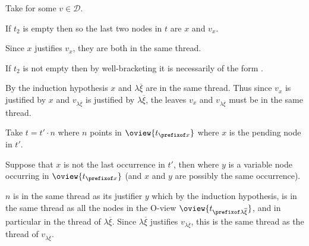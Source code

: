 \begin{compactitem}
    \item[\rulenamet{InputValue}] Take  for some
        $v \in \mathcal{D}$.

        \begin{compactitem}
        \item  If $t_2$ is empty then  so the last two nodes in $t$ are
        $x$ and $v_x$.

        Since $x$ justifies $v_x$, they are both in the same thread.

        \item If $t_2$ is not empty then by well-bracketing it is
        necessarily of the form .

            By the induction hypothesis  $x$ and $\lambda \overline{\xi}$ are in the same thread. Thus since $v_x$
                is justified by $x$ and $v_{\lambda \overline{\xi}}$ is
                justified by $\lambda  \overline{\xi}$, the leaves $v_x$ and $v_{\lambda \overline{\xi}}$ must
                be in the same thread.
        \end{compactitem}

    \item[\rulenamet{InputVar}]  Take $t =
    t' \cdot n$ where $n$ points in $\oview{t_{\prefixof x}}$ where $x$ is the pending node
    in $t'$.

        \begin{compactitem}
        \item  Suppose that $x$ is not the last occurrence in $t'$, then
         where $y$ is a variable node occurring in $\oview{t_{\prefixof x}}$
        (and $x$ and $y$ are possibly the same occurrence).

            $n$ is in the same thread as its justifier $y$ which
            by the induction hypothesis, is in the same thread as all the nodes
            in the O-view $\oview{t_{\prefixof \lambda
            \overline{\xi}}}$, and in particular in the thread of $\lambda
            \overline{\xi}$. Since $\lambda
            \overline{\xi}$ justifies $v_{\lambda
            \overline{\xi}}$, this is the same thread as the thread of $v_{\lambda
            \overline{\xi}}$.


\end{compactitem}
\end{compactitem}

